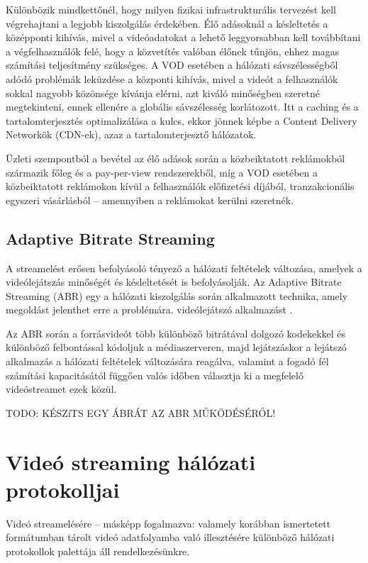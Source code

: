 Különbözik mindkettőnél, hogy milyen fizikai infrastrukturális tervezést kell végrehajtani a legjobb kiszolgálás érdekében. Élő adásoknál a késleltetés a középponti kihívás, mivel a videóadatokat a lehető leggyorsabban kell továbbítani a végfelhasználók felé, hogy a közvetítés valóban élőnek tűnjön, ehhez magas számítási teljesítmény szükséges. A VOD esetében a hálózati sávszélességből adódó problémák leküzdése a központi kihívás, mivel a videót a felhasználók sokkal nagyobb közönsége kívánja elérni, azt kiváló minőségben szeretné megtekinteni, ennek ellenére a globális sávszélesség korlátozott. Itt a caching és a tartalomterjesztés optimalizálása a kulcs, ekkor jönnek képbe a Content Delivery Networkök (CDN-ek), azaz a tartalomterjesztő hálózatok.

Üzleti szempontból a bevétel az élő adások során a közbeiktatott reklámokból származik főleg és a pay-per-view rendszerekből, míg a VOD esetében a közbeiktatott reklámokon kívül a felhasználók előfizetési díjából, tranzakcionális egyszeri vásárlásból -- amennyiben a reklámokat kerülni szeretnék.

\subsection{Adaptive Bitrate Streaming}

A streamelést erősen befolyásoló tényező a hálózati feltételek változása, amelyek a videólejátszás minőségét és késleltetését is befolyásolják. Az Adaptive Bitrate Streaming (ABR) egy a hálózati kiszolgálás során alkalmazott technika, amely megoldást jelenthet erre a problémára.  videólejátszó alkalmazást .

Az ABR során a forrásvideót több különböző bitrátával dolgozó kodekekkel és különböző felbontással kódoljuk a médiaszerveren, majd lejátszáskor a lejátszó alkalmazás a hálózati feltételek változására reagálva, valamint a fogadó fél számítási kapacitásától függően valós időben választja ki a megfelelő vi\-de\-ó\-strea\-met ezek közül.

TODO: KÉSZíTS EGY ÁBRÁT AZ ABR MŰKÖDÉSÉRŐL!

\section{Videó streaming hálózati protokolljai}

Videó streamelésére -- másképp fogalmazva: valamely korábban ismertetett formátumban tárolt videó adatfolyamba való illesztésére különböző hálózati protokollok palettája áll rendelkezésünkre.

